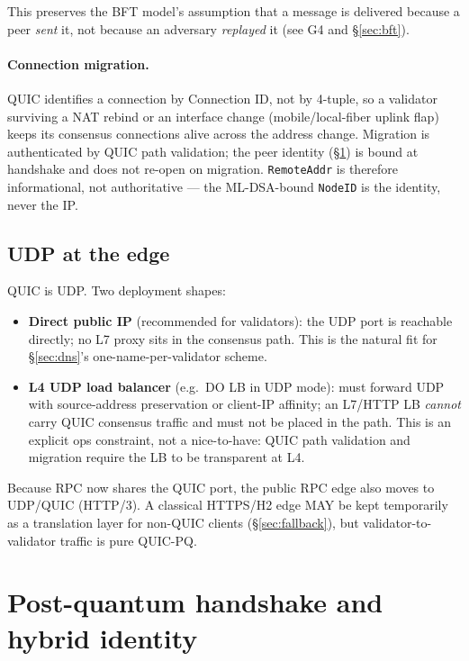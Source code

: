 \documentclass[11pt,a4paper]{article}
\newcommand{\code}[1]{\texttt{#1}}
\begin{document}
This preserves the BFT model's assumption that a message is delivered
because a peer \emph{sent} it, not because an adversary \emph{replayed}
it (see G4 and \S\ref{sec:bft}).

\paragraph{Connection migration.} QUIC identifies a connection by
Connection ID, not by 4-tuple, so a validator surviving a NAT rebind or
an interface change (mobile/local-fiber uplink flap) keeps its
consensus connections alive across the address change. Migration is
authenticated by QUIC path validation; the peer identity
(\S\ref{sec:handshake}) is bound at handshake and does not re-open on
migration. \code{RemoteAddr} is therefore informational, not
authoritative --- the ML-DSA-bound \code{NodeID} is the identity, never
the IP.

\subsection{UDP at the edge}\label{sec:edge}

QUIC is UDP. Two deployment shapes:

\begin{itemize}[nosep]
  \item \textbf{Direct public IP} (recommended for validators): the UDP
        port is reachable directly; no L7 proxy sits in the consensus
        path. This is the natural fit for \S\ref{sec:dns}'s
        one-name-per-validator scheme.
  \item \textbf{L4 UDP load balancer} (e.g.\ DO LB in UDP mode): must
        forward UDP with source-address preservation or client-IP
        affinity; an L7/HTTP LB \emph{cannot} carry QUIC consensus
        traffic and must not be placed in the path. This is an explicit
        ops constraint, not a nice-to-have: QUIC path validation and
        migration require the LB to be transparent at L4.
\end{itemize}

Because RPC now shares the QUIC port, the public RPC edge also moves to
UDP/QUIC (HTTP/3). A classical HTTPS/H2 edge MAY be kept temporarily as a
translation layer for non-QUIC clients (\S\ref{sec:fallback}), but
validator-to-validator traffic is pure QUIC-PQ.

\section{Post-quantum handshake and hybrid identity}\label{sec:handshake}
\end{document}
